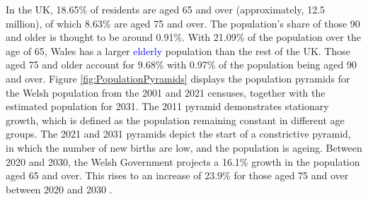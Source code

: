 \documentclass[../thesis.tex]{subfiles}
\begin{document}
In the UK, 18.65\% of residents are aged 65 and over (approximately, 12.5 million), of which 8.63\% are aged 75 and over. The population's share of those 90 and older is thought to be around 0.91\%. With 21.09\% of the population over the age of 65, Wales has a larger \textcolor{blue}{elderly} population than the rest of the UK. Those aged 75 and older account for 9.68\% with 0.97\% of the population being aged 90 and over. Figure \ref{fig:PopulationPyramids} displays the population pyramids for the Welsh population from the 2001 and 2021 censuses, together with the estimated population for 2031. The 2011 pyramid demonstrates stationary growth, which is defined as the population remaining constant in different age groups. The 2021 and 2031 pyramids depict the start of a constrictive pyramid, in which the number of new births are low, and the population is ageing. Between 2020 and 2030, the Welsh Government projects a 16.1\% growth in the population aged 65 and over. This rises to an increase of 23.9\% for those aged 75 and over between 2020 and 2030 \cite{WelshGovernment2022}.
\end{document}
